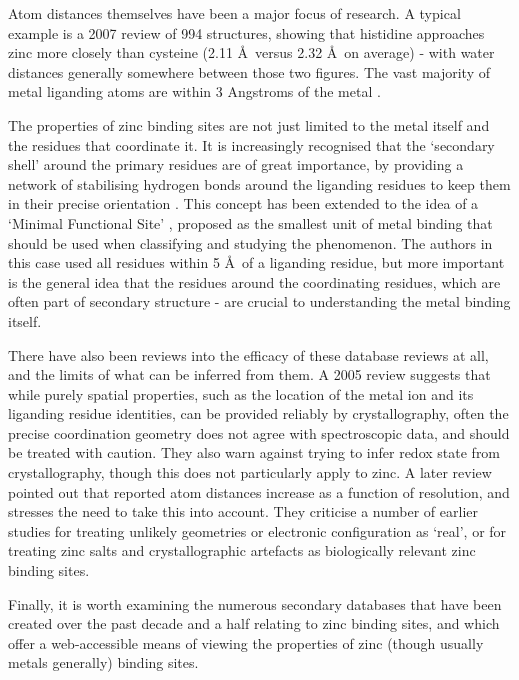 Atom distances themselves have been a major focus of research. A typical example is a 2007 review \cite{tamames2007analysis} of 994 structures, showing that histidine approaches zinc more closely than cysteine (2.11 \AA \ versus 2.32 \AA \ on average) - with water distances generally somewhere between those two figures. The vast majority of metal liganding atoms are within 3 Angstroms of the metal \cite{dokmanic2008metals}.


The properties of zinc binding sites are not just limited to the metal itself and the residues that coordinate it. It is increasingly recognised that the `secondary shell' around the primary residues are of great importance, by providing a network of stabilising hydrogen bonds around the liganding residues to keep them in their precise orientation \cite{auld2001zinc}. This concept has been extended to the idea of a `Minimal Functional Site' \cite{andreini2011minimal}, proposed as the smallest unit of metal binding that should be used when classifying and studying the phenomenon. The authors in this case used all residues within 5 \AA \ of a liganding residue, but more important is the general idea that the residues around the coordinating residues, which are often part of secondary structure - are crucial to understanding the metal binding itself.

There have also been reviews into the efficacy of these database reviews at all, and the limits of what can be inferred from them. A 2005 review \cite{sommerhalter2005x} suggests that while purely spatial properties, such as the location of the metal ion and its liganding residue identities, can be provided reliably by crystallography, often the precise coordination geometry does not agree with spectroscopic data, and should be treated with caution. They also warn against trying to infer redox state from crystallography, though this does not particularly apply to zinc. A later review \cite{laitaoja2013zinc} pointed out that reported atom distances increase as a function of resolution, and stresses the need to take this into account. They criticise a number of earlier studies for treating unlikely geometries or electronic configuration as `real', or for treating zinc salts and crystallographic artefacts as biologically relevant zinc binding sites.

Finally, it is worth examining the numerous secondary databases that have been created over the past decade and a half relating to zinc binding sites, and which offer a web-accessible means of viewing the properties of zinc (though usually metals generally) binding sites.

